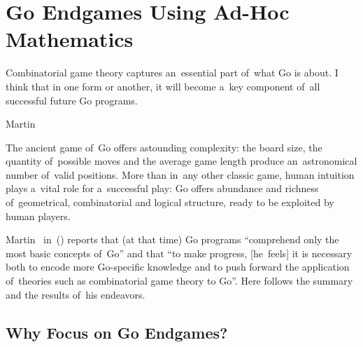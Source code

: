 
\section{Go Endgames Using Ad-Hoc Mathematics}
\epigraph{
  Combinatorial game theory captures an~essential part of~what Go is about.
  I think that in one form or another, it will become a~key component of~all successful future Go programs.%
  \footnotemark
}{Martin~\cite{Muller1995computer}}
The ancient game of~Go offers astounding complexity:
the board size, the quantity of~possible moves and the average game length produce an~astronomical number of~valid positions.
More than in~any other classic game, human intuition plays a~vital role for a~successful play:
Go offers abundance and richness of~geometrical, combinatorial and logical structure, ready to be exploited by human players.


Martin~\Mueller{} in~(\cite{Muller1995computer}) reports that (at that time) Go programs ``comprehend only the most basic concepts of~Go'' and that
``to make progress, [he~feels] it is necessary both to encode more Go-specific knowledge and to push forward the application of~theories such as combinatorial game theory to Go''.
Here follows the summary and the results of~his endeavors.

\subsection{Why Focus on Go Endgames?}

